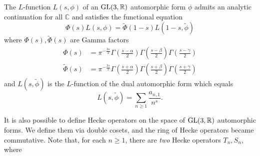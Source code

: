 \begin{theorem}
The $L$-function $L(s, \phi)$ of an $\operatorname{\mathrm{GL}}(3, \mathbb{R})$ automorphic form $\phi$ admits an analytic continuation for all $\mathbb{C}$ and satisfies the functional equation
$$
\Phi(s)L(s, \phi) = \tilde{\Phi}(1-s)L(1-s, \tilde{\phi})
$$
where $\Phi(s), \tilde{\Phi}(s)$ are Gamma factors
\begin{align*}
    \Phi(s) &= \pi^{-\frac{3s}{2}} \Gamma\left(\frac{s -\alpha}{2}\right)
    \Gamma\left(\frac{s -\beta}{2}\right)
    \Gamma\left(\frac{s - \gamma}{2}\right) \\
    \tilde{\Phi}(s) &= \pi^{-\frac{3s}{2}} \Gamma\left(\frac{s + \alpha}{2}\right)
    \Gamma\left(\frac{s + \beta}{2}\right)
    \Gamma\left(\frac{s + \gamma}{2}\right)
\end{align*}
and $L(s, \tilde{\phi})$ is the $L$-function of the dual automorphic form which equals
$$
L(s, \tilde{\phi}) = \sum_{n \geq 1} \frac{a_{n, 1}}{n^{s}}.
$$
\end{theorem}
It is also possible to define Hecke operators on the space of $\operatorname{\mathrm{GL}}(3, \mathbb{R})$ automorphic forms.
We define them via double cosets, and the ring of Hecke operators became commutative.
Note that, for each $n\geq 1$, there are \emph{two} Hecke operators $T_{n}, S_{n}$, where 
